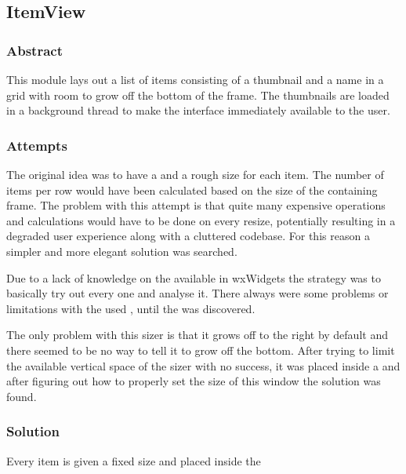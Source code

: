 \subsection{ItemView}
\def \kapitelautor {Clemens Stadlbauer}

\subsubsection{Abstract}
This module lays out a list of items consisting of a thumbnail and a name in a
grid with room to grow off the bottom of the frame. The thumbnails are loaded
in a background thread to make the interface immediately available to the user.

\subsubsection{Attempts}
The original idea was to have a  and a rough size for each
item. The number of items per row would have been calculated based on the size
of the containing frame. The problem with this attempt is that quite many
expensive operations and calculations would have to be done on every resize,
potentially resulting in a degraded user experience along with a cluttered
codebase. For this reason a simpler and more elegant solution was searched.

Due to a lack of knowledge on the available  in wxWidgets the
strategy was to basically try out every one and analyse it. There always were
some problems or limitations with the used , until the
 was discovered.

The only problem with this sizer is that it grows off to the right by default
and there seemed to be no way to tell it to grow off the bottom. After trying
to limit the available vertical space of the sizer with no success, it was
placed inside a  and after figuring out how to properly
set the size of this window the solution was found.

\subsubsection{Solution} %

Every item is given a fixed size and placed inside the 

